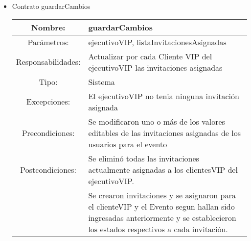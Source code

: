\begin{itemize}
	\item Contrato guardarCambios\\
	\begin{tabular}{|c|p{10cm}|}\hline
		Nombre: & guardarCambios\\\hline	
		Par\'ametros: & ejecutivoVIP, listaInvitacionesAsignadas \\\hline
		Responsabilidades: & Actualizar por cada Cliente VIP del ejecutivoVIP las invitaciones asignadas \\\hline
		Tipo: & Sistema \\\hline
		Excepciones: & El ejecutivoVIP no tenia ninguna invitaci\'on asignada \\\hline
		Precondiciones: & Se modificaron uno o m\'as de los valores editables de las invitaciones asignadas de los usuarios para el evento \\\hline
		Postcondiciones: & Se elimin\'o todas las invitaciones actualmente asignadas a los clientesVIP del ejecutivoVIP.\\ & Se crearon invitaciones y se asignaron para el clienteVIP y el Evento segun hallan sido ingresadas anteriormente y se establecieron los estados respectivos a cada invitaci\'on. \\\hline

	\end{tabular}

\end{itemize}
